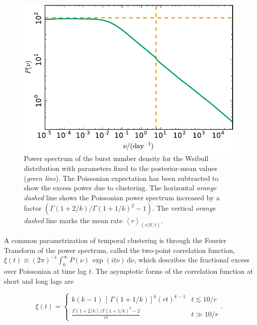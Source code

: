 \documentclass[fleqn,usenatbib]{mnras}
\newcommand{\new}[1]{#1}
\begin{document}
\begin{figure}
	\includegraphics[width=1.0\columnwidth]{powspec_weibull.pdf}
	\caption{\label{fig:powspec}\new{Power spectrum of the burst number density for the Weibull distribution with parameters fixed to the posterior-mean values (\emph{green line}). The Poissonian expectation has been subtracted to show the excess power due to clustering. The horizontal \emph{orange dashed} line shows the Poissonian power spectrum increased by a factor $(\Gamma(1 + 2/k)/\Gamma(1 + 1/k)^2 - 1)$. The vertical \emph{orange dashed} line marks the mean rate $\left<r\right>_{(r|N,t)}$.}}
\end{figure}

\new{
A common parametrization of temporal clustering is through the Fourier
Transform of the power spectrum, called the two-point correlation function, $\xi(t) \equiv (2\pi)^{-1}\int_0^\infty
P(\nu) \, \exp(i t\nu)\, \mathrm{d}\nu$, which describes the fractional 
excess over Poissonian at time lag $t$. The asymptotic forms of the
correlation function at short and long lags are
}
\begin{equation}
\xi(t)=\left\{ \begin{array}{ll}  k(k-1) \, \left[\, \Gamma\left(1 + 1/k\right)\right]^k  (rt)^{k-1} & t \lesssim 10/r \\
               \frac{ \Gamma(1 + 2/k)/\Gamma(1 + 1/k)^2 - 2}{rt} & t \gg 10/r\end{array} \right..
\end{equation}


% 
\end{document}
